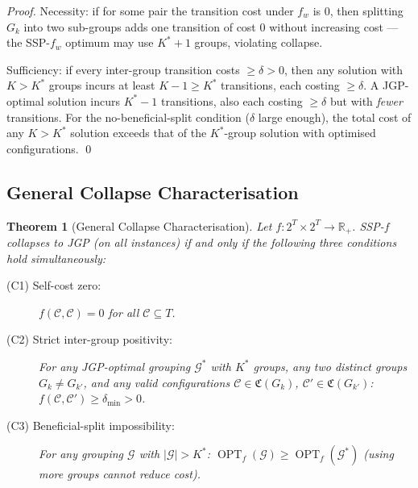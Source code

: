 \documentclass[11pt,a4paper]{article}
\theoremstyle{plain}
\newtheorem{theorem}{Theorem}[section]
\theoremstyle{definition}
\DeclareMathOperator{\OPT}{OPT}
\newcommand{\Cconf}{\mathfrak{C}}   %
\newcommand{\calG}{\mathcal{G}}     %
\newcommand{\Kstar}{K^{*}}          %
\begin{document}
\begin{proof}
Necessity: if for some pair the transition cost under $f_w$ is $0$, then splitting
$G_k$ into two sub-groups adds one transition of cost $0$ without increasing cost ---
the SSP-$f_w$ optimum may use $K^* + 1$ groups, violating collapse.

Sufficiency: if every inter-group transition costs $\ge \delta > 0$, then any solution
with $K > \Kstar$ groups incurs at least $K - 1 \ge \Kstar$ transitions, each costing
$\ge \delta$. A JGP-optimal solution incurs $\Kstar - 1$ transitions, also each
costing $\ge \delta$ but with \emph{fewer} transitions. For the no-beneficial-split
condition ($\delta$ large enough), the total cost of any $K > \Kstar$ solution
exceeds that of the $\Kstar$-group solution with optimised configurations. \qed
\end{proof}

\subsection{General Collapse Characterisation}
\label{sec:general-collapse}

\begin{thmbox}
\begin{theorem}[General Collapse Characterisation]
\label{thm:collapse}
Let $f: 2^T \times 2^T \to \mathbb{R}_+$.
SSP-$f$ collapses to JGP (on all instances) if and only if the following three conditions
hold simultaneously:
\begin{description}
  \item[(C1) Self-cost zero:]
    $f(\mathcal{C}, \mathcal{C}) = 0$ for all $\mathcal{C} \subseteq T$.
  \item[(C2) Strict inter-group positivity:]
    For any JGP-optimal grouping $\calG^*$ with $\Kstar$ groups, any two distinct groups
    $G_k \ne G_{k'}$, and any valid configurations
    $\mathcal{C} \in \Cconf(G_k)$, $\mathcal{C}' \in \Cconf(G_{k'})$:
    $f(\mathcal{C}, \mathcal{C}') \ge \delta_{\min} > 0$.
  \item[(C3) Beneficial-split impossibility:]
    For any grouping $\calG$ with $|\calG| > \Kstar$:
    $\OPT_{f}(\calG) \ge \OPT_{f}(\calG^*)$
    (using more groups cannot reduce cost).
\end{description}
\end{theorem}
\end{thmbox}
\end{document}
